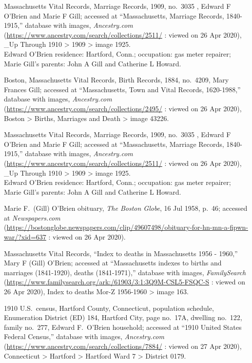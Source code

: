 \begin{thebibliography}{999}
Massachusetts Vital Records, Marriage Records, 1909, no.\ 3035 , Edward F O'Brien and Marie F Gill; accessed at ``Massachusetts, Marriage Records, 1840-1915,'' database with images, \textit{Ancestry.com} (\url{https://www.ancestry.com/search/collections/2511/} : viewed on 26 Apr 2020), \_Up Through 1910 > 1909 > image 1925.\\
Edward O'Brien residence: Hartford, Conn.; occupation: gas meter repairer; Marie Gill's parents: John A Gill and Catherine L Howard.

Boston, Massachusetts Vital Records, Birth Records, 1884, no.\ 4209, Mary Frances Gill; accessed at ``Massachusetts, Town and Vital Records, 1620-1988,'' database with images, \textit{Ancestry.com} (\url{https://www.ancestry.com/search/collections/2495/} : viewed on 26 Apr 2020), Boston > Births, Marriages and Death > image 43226.

Massachusetts Vital Records, Marriage Records, 1909, no.\ 3035 , Edward F O'Brien and Marie F Gill; accessed at ``Massachusetts, Marriage Records, 1840-1915,'' database with images, \textit{Ancestry.com} (\url{https://www.ancestry.com/search/collections/2511/} : viewed on 26 Apr 2020), \_Up Through 1910 > 1909 > image 1925.\\
Edward O'Brien residence: Hartford, Conn.; occupation: gas meter repairer; Marie Gill's parents: John A Gill and Catherine L Howard.

Marie F.\ (Gill) O'Brien obituary, \textit{The Boston Globe}, 16 Jul 1958, p.\ 46; accessed at \textit{Newspapers.com} (\url{https://bostonglobe.newspapers.com/clip/49607498/obituary-for-hn-mn-a-fipwn-war/?xid=637} : viewed on 26 Apr 2020).

Massachusetts Vital Records, ``Index to deaths in Massachusetts 1956 - 1960,'' Mary F (Gill) O'Brien; accessed at ``Massachusetts indexes to births and marriages (1841-1920), deaths (1841-1971),'' database with images, \textit{FamilySearch} (\url{https://www.familysearch.org/ark:/61903/3:1:3Q9M-CSL5-FSQC-S} : viewed on 26 Apr 2020), Index to deaths Mor-Z 1956-1960 > image 163.

1910 U.S.\ census, Hartford County, Connecticut, population schedule, Enumeration District (ED) 184, Hartford City, page no.\ 17A, dwelling no.\ 122, family no.\ 277, Edward F.\ O'Brien household; accessed at ``1910 United States Federal Census,'' database with images, \textit{Ancestry.com} (\url{https://www.ancestry.com/search/collections/7884/} : viewed on 27 Apr 2020), Connecticut > Hartford > Hartford Ward 7 > District 0179.


\end{thebibliography}
